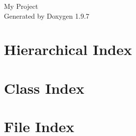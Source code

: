 \documentclass[twoside]{book}
\newcommand{\+}{\discretionary{\mbox{\scriptsize$\hookleftarrow$}}{}{}}
\newcommand{\clearemptydoublepage}{%
    \newpage{\pagestyle{empty}\cleardoublepage}%
  }
\begin{document}
  \raggedbottom
  \begin{titlepage}
  \vspace*{7cm}
  \begin{center}%
  {\Large My Project}\\
  \vspace*{1cm}
  {\large Generated by Doxygen 1.9.7}\\
  \end{center}
  \end{titlepage}
  \clearemptydoublepage
  \tableofcontents
  \clearemptydoublepage
\chapter{Hierarchical Index}

\chapter{Class Index}

\chapter{File Index}

\end{document}
